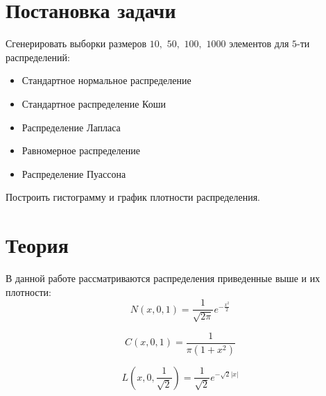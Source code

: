 \documentclass[a4]{article}
\begin{document}

\newpage
\pagestyle{plain}




\newpage
\tableofcontents{}
\newpage


\section{Постановка задачи}

Сгенерировать выборки размеров $10,$ $50,$ $100,$ $1000$ элементов для $5$-ти распределений:
\begin{itemize}
\item Стандартное нормальное распределение
\item Стандартное распределение Коши
\item Распределение Лапласа 
\item Равномерное распределение
\item Распределение Пуассона
\end{itemize}

Построить гистограмму и график плотности распределения.

\section{Теория}

В данной работе рассматриваются распределения приведенные выше и их плотности:
\begin{equation}\label{eqn:normal}
N(x,0,1) = \frac{1}{\sqrt{2\pi}}e^{-\frac{x^2}{2}}
\end{equation} 

\begin{equation}\label{eqn:cauchy}
 C(x,0,1) = \frac{1}{\pi(1+x^2)}
 \end{equation}
 
 \begin{equation}\label{eqn:laplace}
 L\left( x,0,\frac{1}{\sqrt{2}}\right) = \frac{1}{\sqrt{2}}e^{-\sqrt{2}\vert x\vert}
 \end{equation}
 
\end{document}

